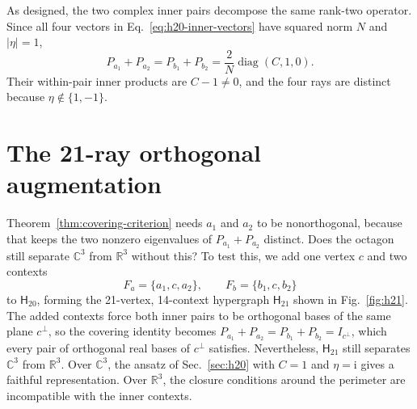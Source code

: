 \documentclass[twocolumn,aps,pra,floatfix,amsmath,amssymb,longbibliography]{revtex4-2}
\newenvironment{handrewrite}{\leavevmode\color{blue}}{}
\theoremstyle{definition}
\theoremstyle{remark}
\newcommand{\ii}{\mathrm{i}}
\newcommand{\C}{\mathbb C}
\newcommand{\R}{\mathbb R}
\newcommand{\Htwenty}{\mathsf H_{20}}
\newcommand{\Htwentyone}{\mathsf H_{21}}
\begin{document}
As designed, the two complex inner pairs decompose the same rank-two
operator.  Since all four vectors in Eq.~\eqref{eq:h20-inner-vectors} have
squared norm $N$ and $|\eta|=1$,
\begin{equation}
 P_{a_1}+P_{a_2}=P_{b_1}+P_{b_2}
 =\frac{2}{N}\operatorname{diag}(C,1,0).
 \label{eq:complex-two-sum}
\end{equation}
Their within-pair inner products are $C-1\ne0$, and the four rays are
distinct because $\eta\notin\{1,-1\}$.

\section{The 21-ray orthogonal augmentation}
\label{sec:h21}

\begin{handrewrite}
Theorem~\ref{thm:covering-criterion} needs $a_1$ and $a_2$ to be
nonorthogonal, because that keeps the two nonzero eigenvalues of
$P_{a_1}+P_{a_2}$ distinct.  Does the octagon still separate $\C^3$ from
$\R^3$ without this?  To test this, we add one vertex $c$ and two contexts
\begin{equation}
 F_a=\{a_1,c,a_2\},\qquad F_b=\{b_1,c,b_2\}
 \label{eq:added-contexts}
\end{equation}
to $\Htwenty$, forming the 21-vertex, 14-context hypergraph $\Htwentyone$
shown in Fig.~\ref{fig:h21}.  The added contexts force both inner pairs to be
orthogonal bases of the same plane $c^\perp$, so the covering identity
becomes $P_{a_1}+P_{a_2}=P_{b_1}+P_{b_2}=I_{c^\perp}$, which every pair of
orthogonal real bases of $c^\perp$ satisfies.  Nevertheless, $\Htwentyone$
still separates $\C^3$ from $\R^3$.  Over $\C^3$, the ansatz of
Sec.~\ref{sec:h20} with $C=1$ and $\eta=\ii$ gives a faithful
representation.  Over $\R^3$, the closure conditions around the perimeter
are incompatible with the inner contexts.
\end{handrewrite}
\end{document}
